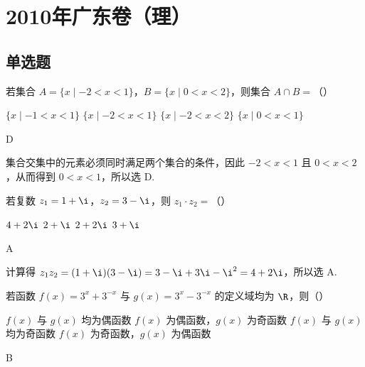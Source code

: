 
\chapter{2010年广东卷（理）}

\section{单选题}

\begin{problem}
若集合 \(A = \{x \mid -2 < x < 1\}\)，\(B = \{x \mid 0 < x < 2\}\)，则集合 \(A \cap B =\)（\quad）

\choices
    {\( \{x \mid -1 < x < 1\} \)}
    {\(\{x\mid -2 < x < 1\}\)}
    {\(\{x\mid -2 < x < 2\}\)}
    {\(\{x\mid 0 < x < 1\}\)}
\end{problem}

\begin{answer}
D
\end{answer}

\begin{solution}
集合交集中的元素必须同时满足两个集合的条件，因此 \(-2<x<1\) 且 \(0<x<2\)，从而得到 \(0<x<1\)，所以选 D.
\end{solution}

\begin{problem}
若复数 \(z_1 = 1 + \i\)，\(z_2 = 3 - \i\)，则 \( z_1 \cdot z_2 = \)（\quad）

\choices
    {\(4 + 2\i\)}
    {\(2 + \i\)}
    {\(2 + 2\i\)}
    {\(3 + \i\)}
\end{problem}

\begin{answer}
A
\end{answer}

\begin{solution}
计算得 \(z_1z_2=(1+\i)(3-\i)=3-\i+3\i-\i^2=4+2\i\)，所以选 A.
\end{solution}

\begin{problem}
若函数 \( f(x) = 3^x + 3^{-x} \) 与 \( g(x) = 3^x - 3^{-x} \) 的定义域均为 \( \R \)，则（\quad）

\choices
    {\(f(x)\) 与 \(g(x)\) 均为偶函数}
    {\(f(x)\) 为偶函数，\(g(x)\) 为奇函数}
    {\(f(x)\) 与 \(g(x)\) 均为奇函数}
    {\(f(x)\) 为奇函数，\(g(x)\) 为偶函数}
\end{problem}

\begin{answer}
B
\end{answer}

